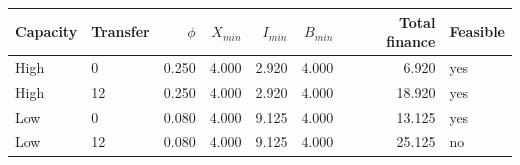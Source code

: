 \begin{tabular}{@{}llrrrrrl@{}}
\toprule
Capacity & Transfer & $\phi$ & $X_{min}$ & $I_{min}$ & $B_{min}$ & Total finance & Feasible \\
\midrule
High & 0 & 0.250 & 4.000 & 2.920 & 4.000 & 6.920 & yes \\
High & 12 & 0.250 & 4.000 & 2.920 & 4.000 & 18.920 & yes \\
Low & 0 & 0.080 & 4.000 & 9.125 & 4.000 & 13.125 & yes \\
Low & 12 & 0.080 & 4.000 & 9.125 & 4.000 & 25.125 & no \\
\bottomrule
\end{tabular}
